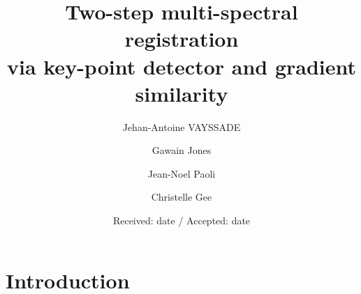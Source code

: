 \documentclass[]{elsarticle}
\begin{document}
	\begin{frontmatter}
		\title{Two-step multi-spectral registration \\ via key-point detector and gradient similarity}
		\author[unilu]{Jehan-Antoine VAYSSADE} 
		\author[unilu]{Gawain Jones} 
		\author[unilu]{Jean-Noel Paoli} 
		\author[unilu]{Christelle Gee} 
		\address[myuni]{Agroécologie, AgroSup Dijon, INRA, Univ. Bourgogne, Univ. Bourgogne Franche-Comté, F-21000 Dijon, France}
		\date{Received: date / Accepted: date}
	\end{frontmatter}
	
	\newpage
	
	\section{Introduction}
	
\end{document}
